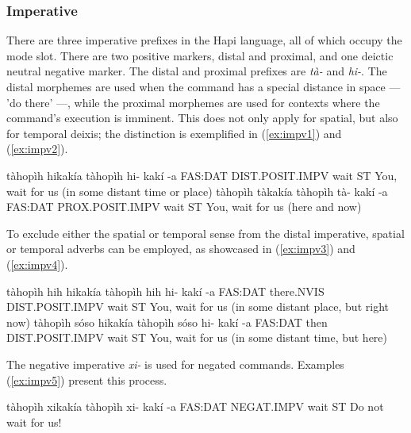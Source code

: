 \documentclass[a4paper, 12pt, oneside]{memoir}
\newcommand{\emh}[1]{\textit{#1}}
\begin{document}
\subsubsection{Imperative}
There are three imperative prefixes in the Hapi language, all of which occupy the mode slot. There are two positive markers, distal and proximal, and one deictic neutral negative marker. The distal and proximal prefixes are \emh{tà-} and \emh{hi-}. The distal morphemes are used when the command has a special distance in space — 'do there' —, while the proximal morphemes are used for contexts where the command's execution is imminent. This does not only apply for spatial, but also for temporal deixis; the distinction is exemplified in (\ref{ex:impv1}) and (\ref{ex:impv2}). 
\begin{examples}
    \ex \label{ex:impv1}
    \words tàhopìh hikakía
    \bits tàhopìh  hi- kakí -a 
    \gloss FAS:DAT DIST.POSIT.IMPV wait ST
    \tr You, wait for us (in some distant time or place)
    \ex \label{ex:impv2}
    \words tàhopìh tàkakía
    \bits tàhopìh  tà- kakí -a 
    \gloss FAS:DAT PROX.POSIT.IMPV wait ST
    \tr You, wait for us (here and now)
\end{examples}
To exclude either the spatial or temporal sense from the distal imperative, spatial or temporal adverbs can be employed, as showcased in (\ref{ex:impv3}) and (\ref{ex:impv4}).
\begin{examples}
    \ex \label{ex:impv3}
    \words tàhopìh hih hikakía
    \bits tàhopìh hih hi- kakí -a
    \gloss FAS:DAT there.NVIS DIST.POSIT.IMPV wait ST
    \tr You, wait for us (in some distant place, but right now)
    \ex \label{ex:impv4}
    \words tàhopìh sóso hikakía
    \bits tàhopìh sóso hi- kakí -a
    \gloss FAS:DAT then DIST.POSIT.IMPV wait ST
    \tr You, wait for us (in some distant time, but here)
\end{examples}
The negative imperative \emh{xi-} is used for negated commands. Examples (\ref{ex:impv5}) present this process.
\begin{examples}
    \ex \label{ex:impv5}
    \words tàhopìh xikakía
    \bits tàhopìh xi- kakí -a
    \gloss FAS:DAT NEGAT.IMPV wait ST
    \tr Do not wait for us!
\end{examples}
\end{document}
